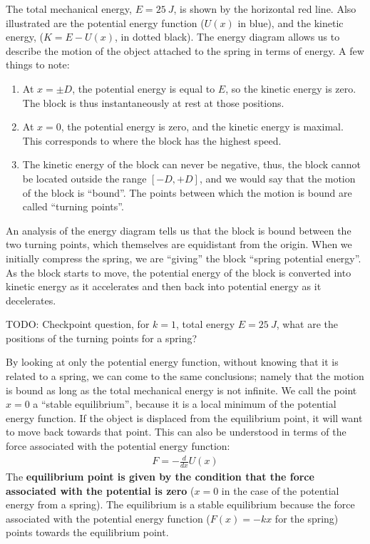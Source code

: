  The total mechanical energy, $E=\SI{25}{J}$, is shown by the horizontal red line. Also illustrated are the potential energy function ($U(x)$ in blue), and the kinetic energy, ($K=E-U(x)$, in dotted black).
The energy diagram allows us to describe the motion of the object attached to the spring in terms of energy. A few things to note:
\begin{enumerate}
\item At $x=\pm D$, the potential energy is equal to $E$, so the kinetic energy is zero. The block is thus instantaneously at rest at those positions.
\item At $x=0$, the potential energy is zero, and the kinetic energy is maximal. This corresponds to where the block has the highest speed. 
\item The kinetic energy of the block can never be negative, thus, the block cannot be located outside the range $[-D,+D]$, and we would say that the motion of the block is ``bound''. The points between which the motion is bound are called ``turning points''.
\end{enumerate}
An analysis of the energy diagram tells us that the block is bound between the two turning points, which themselves are equidistant from the origin. When we initially compress the spring, we are ``giving'' the block ``spring potential energy''. As the block starts to move, the potential energy of the block is converted into kinetic energy as it accelerates and then back into potential energy as it decelerates.

TODO: Checkpoint question, for $k=1$, total energy $E=\SI{25}{J}$, what are the positions of the turning points for a spring?

By looking at only the potential energy function, without knowing that it is related to a spring, we can come to the same conclusions; namely that the motion is bound as long as the total mechanical energy is not infinite. We call the point $x=0$ a ``stable equilibrium'', because it is a local minimum of the potential energy function. If the object is displaced from the equilibrium point, it will want to move back towards that point. This can also be understood in terms of the force associated with the potential energy function:
\begin{align*}
F = -\frac{d}{dx}U(x)
\end{align*}
The \textbf{equilibrium point is given by the condition that the force associated with the potential is zero} ($x=0$ in the case of the potential energy from a spring). The equilibrium is a stable equilibrium because the force associated with the potential energy function ($F(x)=-kx$ for the spring) points towards the equilibrium point.


